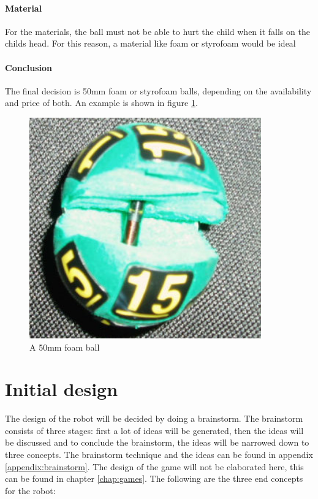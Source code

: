 \documentclass[11pt,twoside,a4paper]{report}
\begin{document}
\subsubsection{Material}
For the materials, the ball must not be able to hurt the child when it falls on the childs head. For this reason, a material like foam or styrofoam would be ideal 
\newpage
\subsubsection{Conclusion}
The final decision is 50mm foam or styrofoam balls, depending on the availability and price of both. An example is shown in figure \ref{figure:lotteryball}.
\begin{figure}[H]
\begin{center}
\includegraphics[width=10cm]{Images/LOTTERY-BALLS-with-rfid.jpg}
\end{center}
\caption{A 50mm foam ball}
\label{figure:lotteryball}
\end{figure}
\chapter{Initial design}
The design of the robot will be decided by doing a brainstorm. The brainstorm consists of three stages: first a lot of ideas will be generated, then the ideas will be discussed and to conclude the brainstorm, the ideas will be narrowed down to three concepts. The brainstorm technique and the ideas can be found in appendix \ref{appendix:brainstorm}. The design of the game will not be elaborated here, this can be found in chapter \ref{chap:games}. The following are the three end concepts for the robot:
\end{document}

